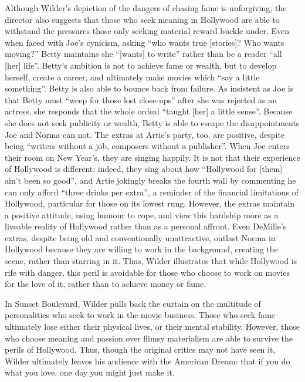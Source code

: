 \documentclass[a4paper]{article}
\begin{document}
Although Wilder’s depiction of the dangers of chasing fame is unforgiving, the director also suggests that those who seek meaning in Hollywood are able to withstand the pressures those only seeking material reward buckle under. Even when faced with Joe’s cynicism, asking “who wants true [stories]? Who wants moving?” Betty maintains she “[wants] to write” rather than be a reader “all [her] life”. Betty’s ambition is not to achieve fame or wealth, but to develop herself, create a career, and ultimately make movies which “say a little something”. Betty is also able to bounce back from failure. As insistent as Joe is that Betty must “weep for those lost close-ups” after she was rejected as an actress, she responds that the whole ordeal “taught [her] a little sense”. Because she does not seek publicity or wealth, Betty is able to escape the disappointments Joe and Norma can not. The extras at Artie’s party, too, are positive, despite being “writers without a job, composers without a publisher”. When Joe enters their room on New Year’s, they are singing happily. It is not that their experience of Hollywood is different: indeed, they sing about how “Hollywood for [them] ain’t been so good”, and Artie jokingly breaks the fourth wall by commenting he can only afford “three drinks per extra”, a reminder of the financial limitations of Hollywood, particular for those on its lowest rung. However, the extras maintain a positive attitude, using humour to cope, and view this hardship more as a liveable reality of Hollywood rather than as a personal affront. Even DeMille’s extras, despite being old and conventionally unattractive, outlast Norma in Hollywood because they are willing to work in the background, creating the scene, rather than starring in it. Thus, Wilder illustrates that while Hollywood is rife with danger, this peril is avoidable for those who choose to work on movies for the love of it, rather than to achieve money or fame.

In Sunset Boulevard, Wilder pulls back the curtain on the multitude of personalities who seek to work in the movie business. Those who seek fame ultimately lose either their physical lives, or their mental stability. However, those who choose meaning and passion over flimsy materialism are able to survive the perils of Hollywood. Thus, though the original critics may not have seen it, Wilder ultimately leaves his audience with the American Dream: that if you do what you love, one day you might just make it.

\newpage
\end{document}
